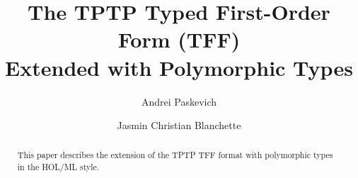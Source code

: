 \documentclass[draft,a4paper]{llncs}
\begin{document}
\title{
The TPTP Typed First-Order Form (TFF) \\ Extended with Polymorphic Types}

\author{
Andrei Paskevich \and Jasmin Christian Blanchette
}


\maketitle

\begin{abstract}
This paper describes the extension of the TPTP TFF format with polymorphic
types in the HOL/ML style.
\end{abstract}



%
%
\end{document}
